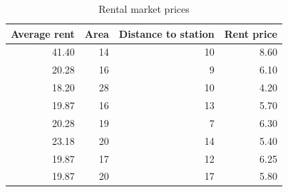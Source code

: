 \begin{table}[ht]
	\caption{Rental market prices}
	\centering
	\begin{tabular}[t]{rrrr}
		\hline
		Average rent & Area & Distance to station & Rent price \\
		\hline
		41.40        & 14   & 10                  & 8.60       \\
		20.28        & 16   & 9                   & 6.10       \\
		18.20        & 28   & 10                  & 4.20       \\
		19.87        & 16   & 13                  & 5.70       \\
		20.28        & 19   & 7                   & 6.30       \\
		23.18        & 20   & 14                  & 5.40       \\
		19.87        & 17   & 12                  & 6.25       \\
		19.87        & 20   & 17                  & 5.80       \\
		\hline
	\end{tabular}
	\label{tbl::ex11_01}
\end{table}

